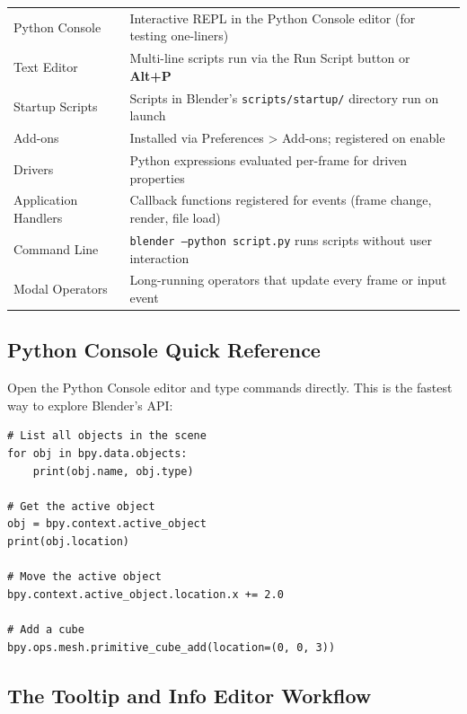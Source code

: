 \begin{center}
\begin{tabularx}{\textwidth}{L{3.5cm}X}
\toprule
{}
 &  \\
\midrule
Python Console & Interactive REPL in the Python Console editor (for testing one-liners) \\
Text Editor & Multi-line scripts run via the Run Script button or \textbf{Alt+P} \\
Startup Scripts & Scripts in Blender's \texttt{scripts/startup/} directory run on launch \\
Add-ons & Installed via Preferences > Add-ons; registered on enable \\
Drivers & Python expressions evaluated per-frame for driven properties \\
Application Handlers & Callback functions registered for events (frame change, render, file load) \\
Command Line & \texttt{blender --python script.py} runs scripts without user interaction \\
Modal Operators & Long-running operators that update every frame or input event \\
\bottomrule
\end{tabularx}
\end{center}

\subsection{Python Console Quick Reference}

Open the Python Console editor and type commands directly. This is the fastest way to explore Blender's API:

\begin{lstlisting}
# List all objects in the scene
for obj in bpy.data.objects:
    print(obj.name, obj.type)

# Get the active object
obj = bpy.context.active_object
print(obj.location)

# Move the active object
bpy.context.active_object.location.x += 2.0

# Add a cube
bpy.ops.mesh.primitive_cube_add(location=(0, 0, 3))
\end{lstlisting}

\subsection{The Tooltip and Info Editor Workflow}

